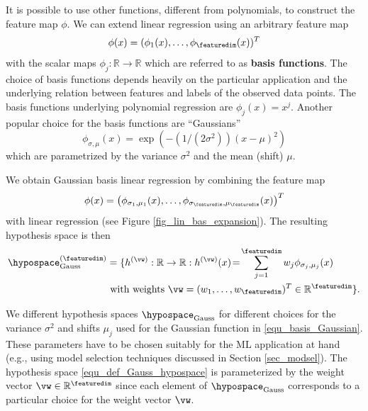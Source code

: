 \documentclass[12pt]{report}
\begin{document}
It is possible to use other functions, different from polynomials, 
to construct the feature map $\phi$. We can extend linear regression 
using an arbitrary feature map 
\begin{equation} 
\phi(x) = (\phi_{1}(x),\ldots,\phi_{\featuredim}(x))^{T}  
\end{equation} 
with the scalar maps $\phi_{j}: \mathbb{R} \rightarrow \mathbb{R}$ which 
are referred to as {\bf basis functions}. The choice of basis functions 
depends heavily on the particular application and the underlying relation 
between features and labels of the observed data points. The basis 
functions underlying polynomial regression are $\phi_{j}(x)= x^{j}$. Another 
popular choice for the basis functions are ``Gaussians'' 
\begin{equation} 
\label{equ_basis_Gaussian}
\phi_{\sigma,\mu}(x) = \exp(-(1/(2\sigma^{2})) (x\!-\!\mu)^{2}) 
\end{equation}
which are parametrized by the variance $\sigma^{2}$ and the mean (shift) $\mu$. 

We obtain Gaussian basis linear regression by combining the feature map 
\begin{equation} 
\phi(x) = \big (\phi_{\sigma_{1},\mu_{1}}(x) ,\ldots,\phi_{\sigma_{\featuredim},\mu_{\featuredim}}(x) \big)^{T} 
\end{equation}
with linear regression (see Figure \ref{fig_lin_bas_expansion}). The resulting hypothesis space is then
\begin{align}
\label{equ_def_Gauss_hypospace}
\hypospace^{(\featuredim)}_{\rm Gauss} & = \{ h^{(\vw)}: \mathbb{R} \rightarrow \mathbb{R}: h^{(\vw)}(x)\!=\!\sum_{j=1}^{\featuredim}  w_{j}\phi_{\sigma_{j},\mu_{j}}(x) \nonumber \\
& \mbox{ with weights } \vw=(w_{1},\ldots,w_{\featuredim})^{T} \in \mathbb{R}^{\featuredim}\}.
\end{align}

We different hypothesis spaces $\hypospace_{\rm Gauss}$ for  
different choices for the variance $\sigma^{2}$ and shifts $\mu_{j}$ 
used for the Gaussian function in \eqref{equ_basis_Gaussian}. 
These parameters have to be chosen suitably for the ML application 
at hand (e.g., using model selection techniques discussed in Section \ref{sec_modsel}). 
The hypothesis space \eqref{equ_def_Gauss_hypospace} is parameterized 
by the weight vector $\vw \in \mathbb{R}^{\featuredim}$ since each element 
of $\hypospace_{\rm Gauss}$ corresponds to a particular choice for the weight vector $\vw$. 
\end{document}
